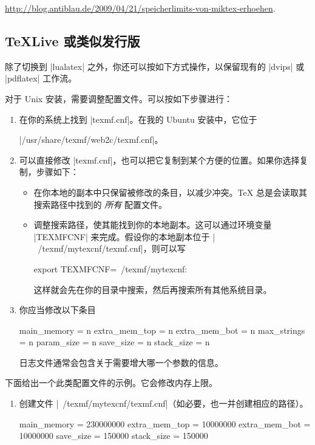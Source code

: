 {\url{http://blog.antiblau.de/2009/04/21/speicherlimits-von-miktex-erhoehen}.


\subsection{\TeX{}Live 或类似发行版}

除了切换到 |lualatex| 之外，你还可以按如下方式操作，以保留现有的 |dvips| 或 |pdflatex| 工作流。

对于 Unix 安装，需要调整配置文件。可以按如下步骤进行：
%
\begin{enumerate}
    \item 在你的系统上找到 |texmf.cnf|。在我的 Ubuntu 安装中，它位于

        |/usr/share/texmf/web2c/texmf.cnf|。
    \item 可以直接修改 |texmf.cnf|，也可以把它复制到某个方便的位置。如果你选择复制，步骤如下：
        \begin{itemize}
            \item 在你本地的副本中只保留被修改的条目，以减少冲突。\TeX{} 总是会读取其搜索路径中找到的 \emph{所有} 配置文件。
            \item 调整搜索路径，使其能找到你的本地副本。这可以通过环境变量 |TEXMFCNF| 来完成。假设你的本地副本位于 |~/texmf/mytexcnf/texmf.cnf|，则可以写
\begin{codeexample}
export TEXMFCNF=~/texmf/mytexcnf:
\end{codeexample}
                这样就会先在你的目录中搜索，然后再搜索所有其他系统目录。
        \end{itemize}
    \item 你应当修改以下条目
\begin{codeexample}
main_memory = n
extra_mem_top = n
extra_mem_bot = n
max_strings = n
param_size = n
save_size = n
stack_size = n
\end{codeexample}
        日志文件通常会包含关于需要增大哪一个参数的信息。
\end{enumerate}
%
下面给出一个此类配置文件的示例。它会修改内存上限。
%
\begin{enumerate}
    \item 创建文件 |~/texmf/mytexcnf/texmf.cnf|（如必要，也一并创建相应的路径）。
\begin{codeexample}
main_memory = 230000000 %
extra_mem_top = 10000000     %
extra_mem_bot = 10000000     %
save_size = 150000    %
stack_size = 150000    %


\end{codeexample}
\end{enumerate}}
